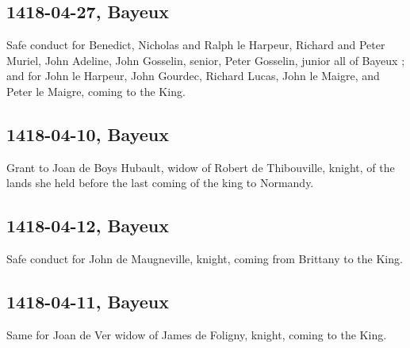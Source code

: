 \documentclass[a4paper,12pt,twoside]{book}
\begin{document}
                
                \subsection{1418-04-27, Bayeux}
                
                
                     Safe conduct for Benedict, Nicholas and Ralph le Harpeur, Richard and Peter Muriel, John Adeline, John Gosselin, senior, Peter Gosselin, junior all of Bayeux ; and for John le Harpeur, John Gourdec, Richard Lucas, John le Maigre, and Peter le Maigre, coming to the King.
                  
                
                \subsection{1418-04-10, Bayeux}
                
                
                     Grant to Joan de Boys Hubault, widow of Robert de Thibouville, knight, of the lands she held before the last coming of the king to Normandy.
                  
                
                \subsection{1418-04-12, Bayeux}
                
                
                     Safe conduct for John de Maugneville, knight, coming from Brittany to the King.
                  
                
                \subsection{1418-04-11, Bayeux}
                
                
                     Same for Joan de Ver widow of James de Foligny, knight, coming to the King.
                  
\end{document}
